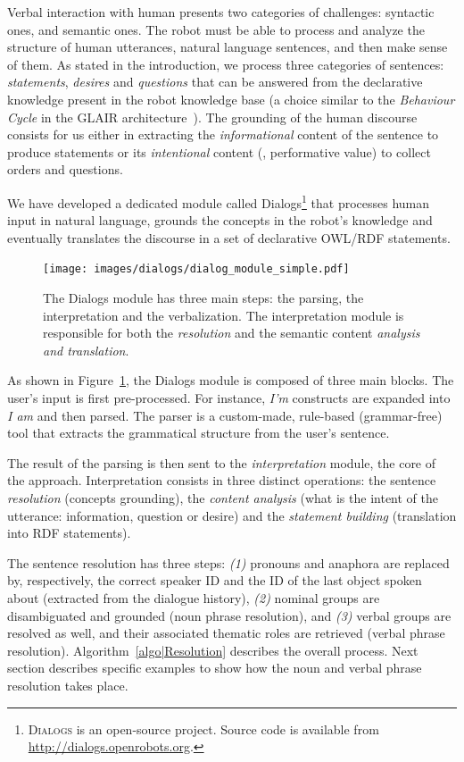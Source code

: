 Verbal interaction with human presents two categories of challenges: syntactic
ones, and semantic ones. The robot must be able to process and analyze the
structure of human utterances, \ie natural language sentences, and then make
sense of them. As stated in the introduction, we process three categories of
sentences: \emph{statements}, \emph{desires} and \emph{questions} that can be
answered from the declarative knowledge present in the robot knowledge base (a
choice similar to the \emph{Behaviour Cycle} in the GLAIR
architecture~\cite{Shapiro2009}). The grounding of the human discourse consists
for us either in extracting the \emph{informational} content of the sentence
to produce statements or its \emph{intentional} content (\ie, performative value)
to collect orders and questions.

We have developed a dedicated module called {\sc
Dialogs}\footnote{\textsc{Dialogs} is an open-source project. Source code is
available from \url{http://dialogs.openrobots.org}.} that processes human
input in natural language, grounds the concepts in the robot's knowledge and
eventually translates the discourse in a set of declarative OWL/RDF statements.

\begin{figure}[!ht]
\centering
  \texttt{[image: images/dialogs/dialog\_module\_simple.pdf]}
  \caption{The {\sc Dialogs} module has three main steps: the parsing,
  the interpretation and the verbalization. The interpretation module is
  responsible for both the \emph{resolution} and the semantic content
  \emph{analysis and translation}.} 
  \label{fig|dialog}
\end{figure}

As shown in Figure~\ref{fig|dialog}, the {\sc Dialogs} module is composed of
three main blocks. The user's input is first pre-processed. For instance,
\emph{I'm} constructs are expanded into \emph{I am} and then parsed. The parser
is a custom-made, rule-based (\ie grammar-free) tool that extracts the
grammatical structure from the user's sentence.

The result of the parsing is then sent to the \emph{interpretation} module, the
core of the approach.  Interpretation consists in three distinct operations:
the sentence \emph{resolution} (concepts grounding), the \emph{content
analysis} (what is the intent of the utterance: information, question or
desire) and the \emph{statement building} (translation into RDF statements).

The sentence resolution has three steps: {\it(1)} pronouns and anaphora are
replaced by, respectively, the correct speaker ID and the ID of the last object
spoken about (extracted from the dialogue history), {\it(2)} nominal groups are
disambiguated and grounded (noun phrase resolution), and {\it(3)} verbal groups
are resolved as well, and their associated thematic roles are retrieved (verbal
phrase resolution). Algorithm~\ref{algo|Resolution} describes the overall
process.  Next section describes specific examples to show how the noun and
verbal phrase resolution takes place.

